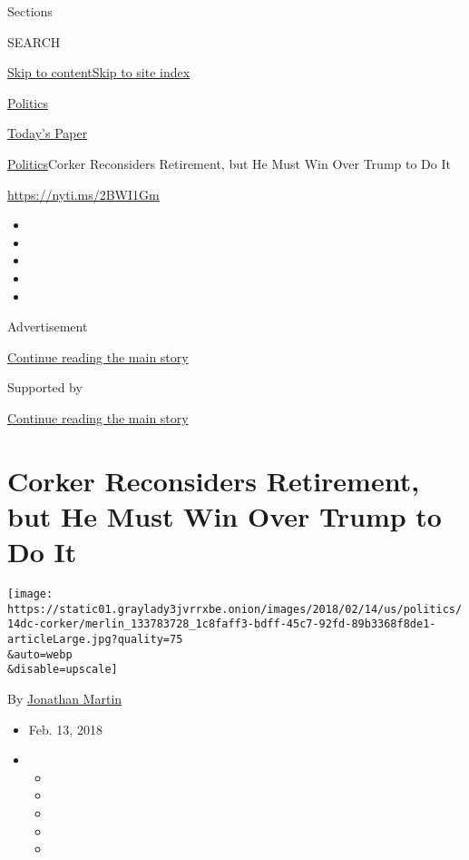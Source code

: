 Sections

SEARCH

\protect\hyperlink{site-content}{Skip to
content}\protect\hyperlink{site-index}{Skip to site index}

\href{https://www.nytimes3xbfgragh.onion/section/politics}{Politics}

\href{https://myaccount.nytimes3xbfgragh.onion/auth/login?response_type=cookie\&client_id=vi}{}

\href{https://www.nytimes3xbfgragh.onion/section/todayspaper}{Today's
Paper}

\href{/section/politics}{Politics}\textbar{}Corker Reconsiders
Retirement, but He Must Win Over Trump to Do It

\url{https://nyti.ms/2BWI1Gm}

\begin{itemize}
\item
\item
\item
\item
\item
\end{itemize}

Advertisement

\protect\hyperlink{after-top}{Continue reading the main story}

Supported by

\protect\hyperlink{after-sponsor}{Continue reading the main story}

\hypertarget{corker-reconsiders-retirement-but-he-must-win-over-trump-to-do-it}{%
\section{Corker Reconsiders Retirement, but He Must Win Over Trump to Do
It}\label{corker-reconsiders-retirement-but-he-must-win-over-trump-to-do-it}}

\texttt{[image: https://static01.graylady3jvrrxbe.onion/images/2018/02/14/us/politics/14dc-corker/merlin\_133783728\_1c8faff3-bdff-45c7-92fd-89b3368f8de1-articleLarge.jpg?quality=75\\\&auto=webp\\\&disable=upscale]}

By \href{http://www.nytimes3xbfgragh.onion/by/jonathan-martin}{Jonathan
Martin}

\begin{itemize}
\item
  Feb. 13, 2018
\item
  \begin{itemize}
  \item
  \item
  \item
  \item
  \item
  \end{itemize}
\end{itemize}

